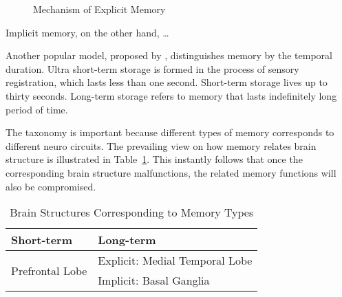 \documentclass{article}
\begin{document}
\begin{figure}[h]
    \centering
    \label{MechofExpMem}
    \caption{Mechanism of Explicit Memory\protect\footnotemark}
\end{figure}
Implicit memory, on the other hand, \dots

Another popular model, proposed by \textcite{atkinsonHumanMemoryProposed1968}, distinguishes memory by the temporal duration. Ultra short-term storage is formed in the process of sensory registration, which lasts less than one second. Short-term storage lives up to thirty seconds. Long-term storage refers to memory that lasts indefinitely long period of time. 

The taxonomy is important because different types of memory corresponds to different neuro circuits. The prevailing view on how memory relates brain structure is illustrated in Table~\ref{BrainStructMemoryTypes}. This instantly follows that once the corresponding brain structure malfunctions, the related memory functions will also be compromised. 

\begin{table}[h]
\centering
\begin{tabular}{@{}ll@{}}
    \toprule
    Short-term      & Long-term \\
    \midrule
    \multirow{2}{*}{Prefrontal Lobe \tablefootnote{\cite{fusterCrossmodalCrosstemporalAssociation2000}}} & Explicit: Medial Temporal Lobe \tablefootnote{\cite{squireMedialTemporalLobe1991}}\\
    & Implicit: Basal Ganglia \tablefootnote{\cite{foerdeRoleBasalGanglia2011}}\\
    \bottomrule
\end{tabular}
\caption{Brain Structures Corresponding to Memory Types}
\label{BrainStructMemoryTypes}
\end{table}
\end{document}
